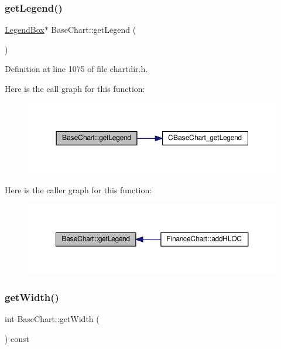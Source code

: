\subsubsection{\texorpdfstring{get\+Legend()}{getLegend()}}
{\footnotesize\ttfamily \hyperlink{class_legend_box}{Legend\+Box}$\ast$ Base\+Chart\+::get\+Legend (\begin{DoxyParamCaption}{ }\end{DoxyParamCaption})\hspace{0.3cm}{\ttfamily [inline]}}



Definition at line 1075 of file chartdir.\+h.

Here is the call graph for this function\+:
\nopagebreak
\begin{figure}[H]
\begin{center}
\leavevmode
\includegraphics[width=350pt]{class_base_chart_a4e8b4c7a977c3000de134fa58b261a93_cgraph}
\end{center}
\end{figure}
Here is the caller graph for this function\+:
\nopagebreak
\begin{figure}[H]
\begin{center}
\leavevmode
\includegraphics[width=350pt]{class_base_chart_a4e8b4c7a977c3000de134fa58b261a93_icgraph}
\end{center}
\end{figure}
\mbox{\label{class_base_chart_a03cb746f83c8b4cc8e49e55986c5e44a}} 
\subsubsection{\texorpdfstring{get\+Width()}{getWidth()}}
{\footnotesize\ttfamily int Base\+Chart\+::get\+Width (\begin{DoxyParamCaption}{ }\end{DoxyParamCaption}) const\hspace{0.3cm}{\ttfamily [inline]}}



